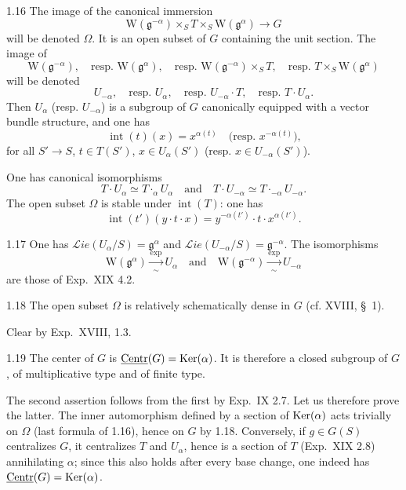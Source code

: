 \begin{notation}{1.16}\label{XX.1.16}
The image of the canonical immersion
\[
\mathrm W(\mathfrak g^{-\alpha})\mathbin{\times_S}T\mathbin{\times_S}\mathrm W(\mathfrak g^\alpha)\to G
\]
will be denoted $\Omega$. It is an open subset of $G$ containing the unit section. The image of
\[
\mathrm W(\mathfrak g^{-\alpha}),\quad\text{resp. }\mathrm W(\mathfrak g^\alpha),\quad
\text{resp. }\mathrm W(\mathfrak g^{-\alpha})\mathbin{\times_S}T,\quad
\text{resp. }T\mathbin{\times_S}\mathrm W(\mathfrak g^\alpha)
\]
will be denoted{\renewcommand{\thefootnote}{(6)}}
\[
U_{-\alpha},\quad\text{resp. }U_\alpha,\quad\text{resp. }U_{-\alpha}\cdot T,\quad\text{resp. }T\cdot U_\alpha.
\]
Then $U_\alpha$ (resp. $U_{-\alpha}$) is a subgroup of $G$ canonically equipped with a vector bundle structure, and one has
\[
\operatorname{int}(t)(x)=x^{\alpha(t)}\quad\text{(resp. }x^{-\alpha(t)}\text{),}
\]
for all $S'\to S$, $t\in T(S')$, $x\in U_\alpha(S')$ (resp. $x\in U_{-\alpha}(S')$).

One has canonical isomorphisms
\[
T\cdot U_\alpha\simeq T\cdot_\alpha U_\alpha\quad\text{and}\quad
T\cdot U_{-\alpha}\simeq T\cdot_{-\alpha}U_{-\alpha}.
\]
The open subset $\Omega$ is stable under $\operatorname{int}(T)$: one has
\[
\operatorname{int}(t')(y\cdot t\cdot x)=y^{-\alpha(t')}\cdot t\cdot x^{\alpha(t')}.
\]
\end{notation}

\begin{corollary}{1.17}\label{XX.1.17}
One has $\mathcal{L}\!ie(U_\alpha/S)=\mathfrak g^\alpha$ and $\mathcal{L}\!ie(U_{-\alpha}/S)=\mathfrak g^{-\alpha}$. The isomorphisms
\[
\mathrm W(\mathfrak g^\alpha)\xrightarrow[\sim]{\exp}U_\alpha\quad\text{and}\quad
\mathrm W(\mathfrak g^{-\alpha})\xrightarrow[\sim]{\exp}U_{-\alpha}
\]
are those of Exp.~XIX 4.2.
\end{corollary}
\begin{corollary}{1.18}\label{XX.1.18}
The open subset $\Omega$ is relatively schematically dense in $G$ (cf. XVIII, \S~1).
\end{corollary}
Clear by Exp.~XVIII, 1.3.{\renewcommand{\thefootnote}{(7)}}

\begin{corollary}{1.19}\label{XX.1.19}
The center of $G$ is $\underline{\mathrm{Centr}}(G)=\operatorname{Ker}(\alpha)$. It is therefore a closed subgroup of $G$, of multiplicative type and of finite type.
\end{corollary}
The second assertion follows from the first by Exp.~IX 2.7. Let us therefore prove the latter. The inner automorphism defined by a section of $\operatorname{Ker}(\alpha)$ acts trivially on $\Omega$ (last formula of 1.16), hence on $G$ by 1.18. Conversely, if $g\in G(S)$ centralizes $G$, it centralizes $T$ and $U_\alpha$, hence is a section of $T$ (Exp.~XIX 2.8) annihilating $\alpha$; since this also holds after every base change, one indeed has $\underline{\mathrm{Centr}}(G)=\operatorname{Ker}(\alpha)$.

